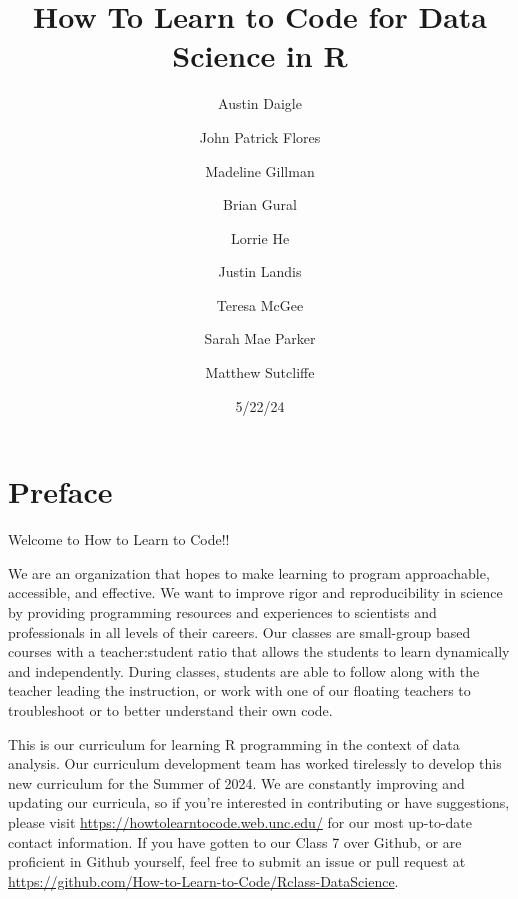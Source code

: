 \documentclass[
  letterpaper,
  DIV=11,
  numbers=noendperiod]{scrreprt}
\title{How To Learn to Code for Data Science in R}
\author{Austin Daigle \and John Patrick Flores \and Madeline
Gillman \and Brian Gural \and Lorrie He \and Justin Landis \and Teresa
McGee \and Sarah Mae Parker \and Matthew Sutcliffe}
\date{5/22/24}
\renewcommand*\contentsname{Table of contents}
\newcommand\contentsname{Table of contents}
\begin{document}
\maketitle
\ifdefined\Shaded\renewenvironment{Shaded}{\begin{tcolorbox}[boxrule=0pt, sharp corners, enhanced, borderline west={3pt}{0pt}{shadecolor}, frame hidden, interior hidden, breakable]}{\end{tcolorbox}}\fi

\renewcommand*\contentsname{Table of contents}
{
\hypersetup{linkcolor=}
\setcounter{tocdepth}{2}
\tableofcontents
}

\hypertarget{preface}{%
\chapter*{Preface}\label{preface}}


Welcome to How to Learn to Code!!

We are an organization that hopes to make learning to program
approachable, accessible, and effective. We want to improve rigor and
reproducibility in science by providing programming resources and
experiences to scientists and professionals in all levels of their
careers. Our classes are small-group based courses with a
teacher:student ratio that allows the students to learn dynamically and
independently. During classes, students are able to follow along with
the teacher leading the instruction, or work with one of our floating
teachers to troubleshoot or to better understand their own code.

This is our curriculum for learning R programming in the context of data
analysis. Our curriculum development team has worked tirelessly to
develop this new curriculum for the Summer of 2024. We are constantly
improving and updating our curricula, so if you're interested in
contributing or have suggestions, please visit
\url{https://howtolearntocode.web.unc.edu/} for our most up-to-date
contact information. If you have gotten to our Class 7 over Github, or
are proficient in Github yourself, feel free to submit an issue or pull
request at
\url{https://github.com/How-to-Learn-to-Code/Rclass-DataScience}.
\end{document}
